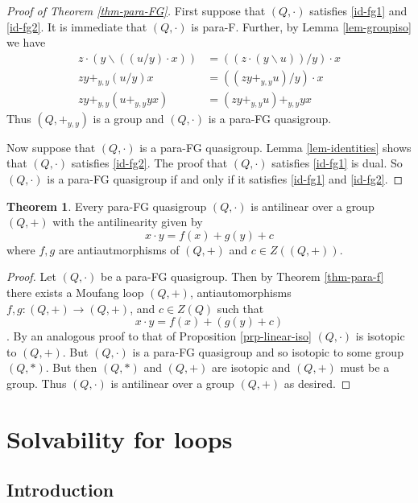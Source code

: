 \documentclass[12pt]{report}
\theoremstyle{definition}
\newtheorem{thm}{Theorem}[chapter]
\newcommand{\ldv}{\backslash}       %
\newcommand{\rdv}{/}                %
\begin{document}
\begin{proof}[Proof of Theorem \ref{thm-para-FG}]
  First suppose that $(Q, \cdot)$ satisfies \ref{id-fg1} and \ref{id-fg2}. It is immediate
    that $(Q, \cdot)$ is para-F. Further, by Lemma \ref{lem-groupiso} we have
  \begin{align*}
    z\cdot (y\ldv ((u\rdv y)\cdot x)) &= ((z\cdot (y\ldv u))\rdv y)\cdot x\\
    zy +_{y, y} (u\rdv y)x &= ((zy +_{y, y} u)\rdv y) \cdot x\\
    zy +_{y, y} (u +_{y, y} yx) &= (zy +_{y, y} u) +_{y, y} yx
  \end{align*}
  Thus $(Q, +_{y, y})$ is a group and $(Q, \cdot)$ is a para-FG quasigroup.

  Now suppose that $(Q, \cdot)$ is a para-FG quasigroup. Lemma \ref{lem-identities} shows that
    $(Q, \cdot)$ satisfies \ref{id-fg2}. The proof that $(Q, \cdot)$ satisfies \ref{id-fg1} is
    dual. So $(Q, \cdot)$ is a para-FG quasigroup if and only if it satisfies \ref{id-fg1} and \ref{id-fg2}.
\end{proof}

\begin{thm}
  Every para-FG quasigroup $(Q, \cdot)$ is antilinear over a group $(Q, +)$ with the antilinearity given by
  \[x\cdot y = f(x) + g(y) + c\]
  where $f, g$ are antiautmorphisms of $(Q, +)$ and $c\in Z((Q, +))$.
\end{thm}

\begin{proof}
  Let $(Q, \cdot)$ be a para-FG quasigroup. Then by Theorem \ref{thm-para-f} there exists a Moufang
    loop $(Q, +)$, antiautomorphisms $f, g: (Q, +)\to (Q, +)$, and $c\in Z(Q)$ such that
  \[x\cdot y = f(x) + (g(y) + c)\].
  By an analogous proof to that of Proposition \ref{prp-linear-iso} $(Q, \cdot)$ is isotopic to
    $(Q, +)$. But $(Q, \cdot)$ is a para-FG quasigroup and so isotopic to some group $(Q, *)$. But
    then $(Q, *)$ and $(Q, +)$ are isotopic and $(Q, +)$ must be a group. Thus $(Q, \cdot)$ is
    antilinear over a group $(Q, +)$ as desired.
\end{proof}


\chapter{Solvability for loops}

\section{Introduction}
\end{document}
